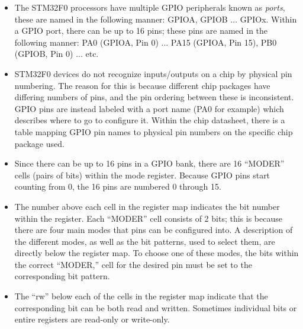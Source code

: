 \documentclass[11pt,fleqn]{book} %
\begin{document}
\begin{itemize}
    \item The STM32F0 processors have multiple GPIO peripherals known as \textit{ports}, these are named in the following manner: GPIOA, GPIOB ... GPIOx. Within a GPIO port, there can be up to 16 pins; these pins are named in the following manner: PA0 (GPIOA, Pin 0) ... PA15 (GPIOA, Pin 15), PB0 (GPIOB, Pin 0) ... etc.
    \item STM32F0 devices do not recognize inputs/outputs on a chip by physical pin numbering. The reason for this is because different chip packages have differing numbers of pins, and the pin ordering between these is inconsistent. GPIO pins are instead labeled with a port name (PA0 for example) which describes where to go to configure it. Within the chip datasheet, there is a table mapping GPIO pin names to physical pin numbers on the specific chip package used.
    \item Since there can be up to 16 pins in a GPIO bank, there are 16 ``MODER'' cells (pairs of bits) within the mode register. Because GPIO pins start counting from 0, the 16 pins are numbered 0 through 15.
    \item The number above each cell in the register map indicates the bit number within the register. Each ``MODER'' cell consists of 2 bits; this is because there are four main modes that pins can be configured into. A description of the different modes, as well as the bit patterns, used to select them, are directly below the register map.
    To choose one of these modes, the bits within the correct ``MODER,'' cell for the desired pin must be set to the corresponding bit pattern.
    \item The ``rw'' below each of the cells in the register map indicate that the corresponding bit can be both read and written. Sometimes individual bits or entire registers are read-only or write-only.
\end{itemize}
\end{document}
